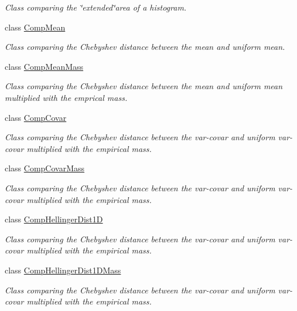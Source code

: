 \begin{DoxyCompactItemize}
\begin{DoxyCompactList}\small\item\em \-Class comparing the \char`\"{}extended\char`\"{}area of a histogram. \end{DoxyCompactList}\item 
class \hyperlink{classsubpavings_1_1CompMean}{\-Comp\-Mean}
\begin{DoxyCompactList}\small\item\em \-Class comparing the \-Chebyshev distance between the mean and uniform mean. \end{DoxyCompactList}\item 
class \hyperlink{classsubpavings_1_1CompMeanMass}{\-Comp\-Mean\-Mass}
\begin{DoxyCompactList}\small\item\em \-Class comparing the \-Chebyshev distance between the mean and uniform mean multiplied with the emprical mass. \end{DoxyCompactList}\item 
class \hyperlink{classsubpavings_1_1CompCovar}{\-Comp\-Covar}
\begin{DoxyCompactList}\small\item\em \-Class comparing the \-Chebyshev distance between the var-\/covar and uniform var-\/covar multiplied with the empirical mass. \end{DoxyCompactList}\item 
class \hyperlink{classsubpavings_1_1CompCovarMass}{\-Comp\-Covar\-Mass}
\begin{DoxyCompactList}\small\item\em \-Class comparing the \-Chebyshev distance between the var-\/covar and uniform var-\/covar multiplied with the empirical mass. \end{DoxyCompactList}\item 
class \hyperlink{classsubpavings_1_1CompHellingerDist1D}{\-Comp\-Hellinger\-Dist1\-D}
\begin{DoxyCompactList}\small\item\em \-Class comparing the \-Chebyshev distance between the var-\/covar and uniform var-\/covar multiplied with the empirical mass. \end{DoxyCompactList}\item 
class \hyperlink{classsubpavings_1_1CompHellingerDist1DMass}{\-Comp\-Hellinger\-Dist1\-D\-Mass}
\begin{DoxyCompactList}\small\item\em \-Class comparing the \-Chebyshev distance between the var-\/covar and uniform var-\/covar multiplied with the empirical mass. \end{DoxyCompactList}\item 

\end{DoxyCompactItemize}

